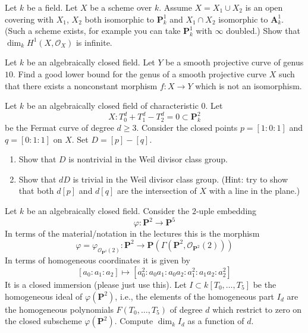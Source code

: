 \begin{exercise}
\label{exercise-coh-P1-infty-doubled}
Let $k$ be a field. Let $X$ be a scheme over $k$. Assume $X = X_1 \cup X_2$
is an open covering with $X_1$, $X_2$ both isomorphic to $\mathbf{P}^1_k$
and $X_1 \cap X_2$ isomorphic to $\mathbf{A}^1_k$. (Such a scheme exists,
for example you can take $\mathbf{P}^1_k$ with $\infty$ doubled.)
Show that $\dim_k H^1(X, \mathcal{O}_X)$ is infinite.
\end{exercise}

\begin{exercise}
\label{exercise-no-morphism}
Let $k$ be an algebraically closed field. Let $Y$ be a smooth projective
curve of genus $10$. Find a good lower bound for the
genus of a smooth projective
curve $X$ such that there exists a nonconstant morphism $f : X \to Y$
which is not an isomorphism.
\end{exercise}

\begin{exercise}
\label{exercise-element-order-n-in-pic}
Let $k$ be an algebraically closed field of characteristic $0$.
Let
$$
X : T_0^d + T_1^d - T_2^d = 0 \subset \mathbf{P}^2_k
$$
be the Fermat curve of degree $d \geq 3$. Consider the closed points
$p = [1 : 0 : 1]$ and $q = [0 : 1 : 1]$ on $X$. Set $D = [p] - [q]$.
\begin{enumerate}
\item Show that $D$ is nontrivial in the Weil divisor class group.
\item Show that $d D$ is trivial in the Weil divisor class group.
(Hint: try to show that both $d[p]$ and $d[q]$ are the intersection
of $X$ with a line in the plane.)
\end{enumerate}
\end{exercise}

\begin{exercise}
\label{exercise-number-equations}
Let $k$ be an algebraically closed field. Consider the $2$-uple embedding
$$
\varphi : \mathbf{P}^2 \longrightarrow \mathbf{P}^5
$$
In terms of the material/notation in the lectures this is the morphism
$$
\varphi = \varphi_{\mathcal{O}_{\mathbf{P}^2}(2)} :
\mathbf{P}^2
\longrightarrow
\mathbf{P}(\Gamma(\mathbf{P}^2, \mathcal{O}_{\mathbf{P}^2}(2)))
$$
In terms of homogeneous coordinates it is given by
$$
[a_0 : a_1 : a_2] \longmapsto
[a_0^2 : a_0a_1 : a_0a_2 : a_1^2 : a_1a_2 : a_2^2]
$$
It is a closed immersion (please just use this).
Let $I \subset k[T_0, \ldots, T_5]$ be the homogeneous ideal
of $\varphi(\mathbf{P}^2)$, i.e., the elements of the
homogeneous part $I_d$ are the
homogeneous polynomials $F(T_0, \ldots, T_5)$ of degree $d$ which
restrict to zero on the closed subscheme $\varphi(\mathbf{P}^2)$.
Compute $\dim_k I_d$ as a function of $d$.
\end{exercise}

